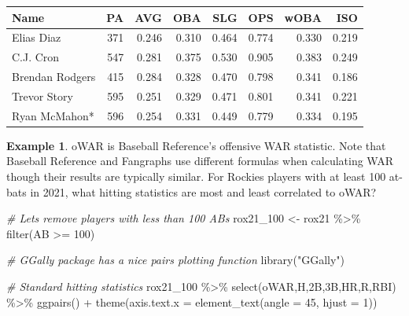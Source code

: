 \documentclass[
  11pt,
]{book}
\newenvironment{Shaded}{\begin{snugshade}}{\end{snugshade}}
\newcommand{\AttributeTok}[1]{\textcolor[rgb]{0.77,0.63,0.00}{#1}}
\newcommand{\CommentTok}[1]{\textcolor[rgb]{0.56,0.35,0.01}{\textit{#1}}}
\newcommand{\DecValTok}[1]{\textcolor[rgb]{0.00,0.00,0.81}{#1}}
\newcommand{\FunctionTok}[1]{\textcolor[rgb]{0.00,0.00,0.00}{#1}}
\newcommand{\NormalTok}[1]{#1}
\newcommand{\OtherTok}[1]{\textcolor[rgb]{0.56,0.35,0.01}{#1}}
\newcommand{\SpecialCharTok}[1]{\textcolor[rgb]{0.00,0.00,0.00}{#1}}
\newcommand{\StringTok}[1]{\textcolor[rgb]{0.31,0.60,0.02}{#1}}
\theoremstyle{definition}
\theoremstyle{definition}
\newtheorem{example}{Example}[chapter]
\theoremstyle{definition}
\theoremstyle{definition}
\theoremstyle{remark}
\begin{document}
\begin{table}[H]
\centering
\begin{tabular}{lrrrrrrr}
\toprule
Name & PA & AVG & OBA & SLG & OPS & wOBA & ISO\\
\midrule
Elias Diaz & 371 & 0.246 & 0.310 & 0.464 & 0.774 & 0.330 & 0.219\\
C.J. Cron & 547 & 0.281 & 0.375 & 0.530 & 0.905 & 0.383 & 0.249\\
Brendan Rodgers & 415 & 0.284 & 0.328 & 0.470 & 0.798 & 0.341 & 0.186\\
Trevor Story & 595 & 0.251 & 0.329 & 0.471 & 0.801 & 0.341 & 0.221\\
Ryan McMahon* & 596 & 0.254 & 0.331 & 0.449 & 0.779 & 0.334 & 0.195\\
\bottomrule
\end{tabular}
\end{table}

\vfill
\newpage

\begin{example}
oWAR is Baseball Reference's offensive WAR statistic. Note that Baseball Reference and Fangraphs use different formulas when calculating WAR though their results are typically similar. For Rockies players with at least 100 at-bats in 2021, what hitting statistics are most and least correlated to oWAR?
\end{example}

\begin{Shaded}
\begin{Highlighting}[]
\CommentTok{\# Let\textquotesingle{}s remove players with less than 100 ABs}
\NormalTok{rox21\_100 }\OtherTok{\textless{}{-}}\NormalTok{ rox21 }\SpecialCharTok{\%\textgreater{}\%} \FunctionTok{filter}\NormalTok{(AB }\SpecialCharTok{\textgreater{}=} \DecValTok{100}\NormalTok{)}

\CommentTok{\# GGally package has a nice pairs plotting function}
\FunctionTok{library}\NormalTok{(}\StringTok{"GGally"}\NormalTok{)}

\CommentTok{\# Standard hitting statistics}
\NormalTok{rox21\_100 }\SpecialCharTok{\%\textgreater{}\%} \FunctionTok{select}\NormalTok{(oWAR,H,}\StringTok{\textasciigrave{}}\AttributeTok{2B}\StringTok{\textasciigrave{}}\NormalTok{,}\StringTok{\textasciigrave{}}\AttributeTok{3B}\StringTok{\textasciigrave{}}\NormalTok{,HR,R,RBI) }\SpecialCharTok{\%\textgreater{}\%} \FunctionTok{ggpairs}\NormalTok{() }\SpecialCharTok{+}
  \FunctionTok{theme}\NormalTok{(}\AttributeTok{axis.text.x =} \FunctionTok{element\_text}\NormalTok{(}\AttributeTok{angle =} \DecValTok{45}\NormalTok{, }\AttributeTok{hjust =} \DecValTok{1}\NormalTok{))}
\end{Highlighting}
\end{Shaded}
\end{document}
